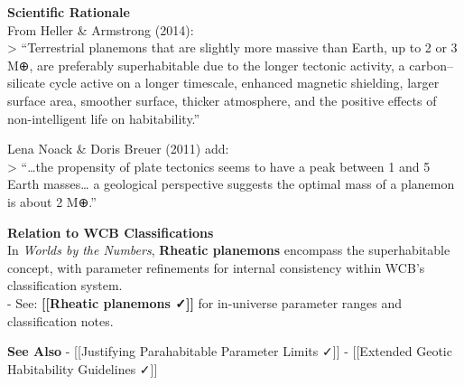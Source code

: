\documentclass[
  letterpaper,
]{book}
\begin{document}
\textbf{Scientific Rationale}\\
From Heller \& Armstrong (2014):\\
\textgreater{} ``Terrestrial planemons that are slightly more massive
than Earth, up to 2 or 3 M⊕, are preferably superhabitable due to the
longer tectonic activity, a carbon--silicate cycle active on a longer
timescale, enhanced magnetic shielding, larger surface area, smoother
surface, thicker atmosphere, and the positive effects of non-intelligent
life on habitability.''

Lena Noack \& Doris Breuer (2011) add:\\
\textgreater{} ``\ldots the propensity of plate tectonics seems to have
a peak between 1 and 5 Earth masses\ldots{} a geological perspective
suggests the optimal mass of a planemon is about 2 M⊕.''

\textbf{Relation to WCB Classifications}\\
In \emph{Worlds by the Numbers}, \textbf{Rheatic planemons} encompass
the superhabitable concept, with parameter refinements for internal
consistency within WCB's classification system.\\
- See: \textbf{{[}{[}Rheatic planemons ✓{]}{]}} for in-universe
parameter ranges and classification notes.

\textbf{See Also} - {[}{[}Justifying Parahabitable Parameter Limits
✓{]}{]} - {[}{[}Extended Geotic Habitability Guidelines ✓{]}{]}
\end{document}
